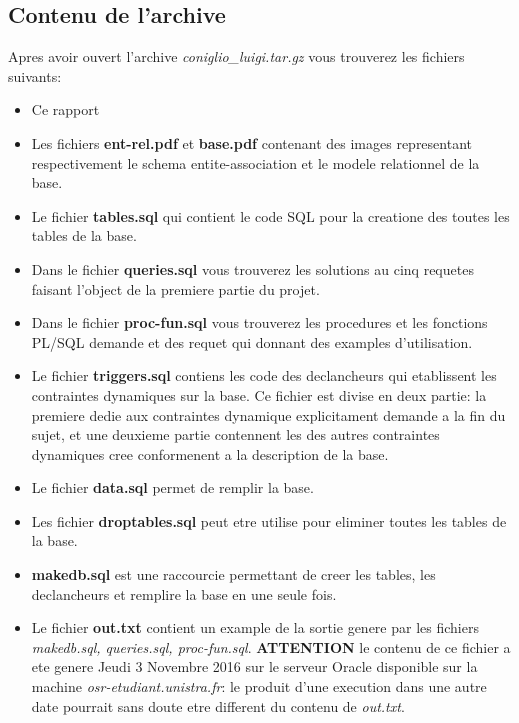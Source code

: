 \documentclass[twoside,openright,a4paper,11pt,french]{article}
\begin{document}
\subsection{Contenu de l'archive}
Apres avoir ouvert l'archive {\it coniglio\_luigi.tar.gz} vous
trouverez les fichiers suivants:
\smallbreak
\begin{itemize}
\item Ce rapport
\item Les fichiers {\bf ent-rel.pdf} et {\bf base.pdf} contenant
      des images representant respectivement le schema entite-association
      et le modele relationnel de la base.
\item Le fichier {\bf tables.sql} qui contient le code SQL pour la
      creatione des toutes les tables de la base.
\item Dans le fichier {\bf queries.sql} vous trouverez les solutions
      au cinq requetes faisant l'object de la premiere partie du projet.
\item Dans le fichier {\bf proc-fun.sql} vous trouverez les procedures
      et les fonctions PL/SQL demande et des requet qui donnant des 
      examples d'utilisation.
\item Le fichier {\bf triggers.sql} contiens les code des declancheurs qui
      etablissent les contraintes dynamiques sur la base.  Ce fichier est divise en
      deux partie: la premiere dedie aux contraintes dynamique explicitament
      demande a la fin du sujet, et une deuxieme partie contennent les
      des autres contraintes dynamiques cree conformenent a la description de la
      base.
\item Le fichier {\bf data.sql} permet de remplir la base.
\item Les fichier {\bf droptables.sql} peut etre utilise pour eliminer toutes 
      les tables de la base.
\item {\bf makedb.sql} est une raccourcie permettant de creer les tables, les
      declancheurs et remplire la base en une seule fois.
\item Le fichier {\bf out.txt} contient un example de la sortie genere par 
      les fichiers {\it makedb.sql, queries.sql, proc-fun.sql}. {\bf ATTENTION} le 
      contenu de ce fichier a ete genere Jeudi 3 Novembre 2016 sur le serveur Oracle
      disponible sur la machine {\it osr-etudiant.unistra.fr}: le produit
      d'une execution dans une autre date pourrait sans doute etre different du 
      contenu de {\it out.txt}.
\end{itemize}
\end{document}
